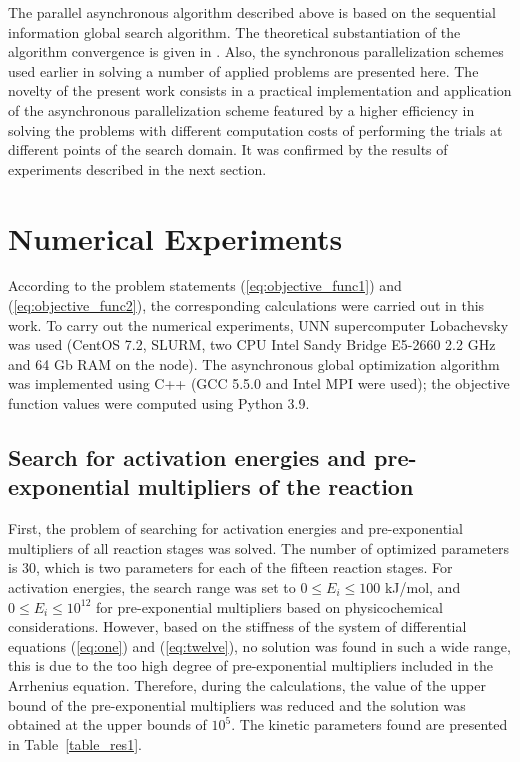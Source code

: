 \documentclass{svproc}
\begin{document}
The parallel asynchronous algorithm described above is based on the sequential information global search algorithm. The theoretical substantiation of the algorithm convergence is given in \cite{Strongin2000}. Also, the synchronous parallelization schemes used earlier in solving a number of applied problems \cite{Kalyulin2017,Modorskii2016} are presented here.
The novelty of the present work consists in a practical implementation and application of the asynchronous parallelization scheme featured by a higher efficiency in solving the problems with different computation costs of performing the trials at different points of the search domain. 
It was confirmed by the results of experiments described in the next section.

\section{Numerical Experiments}\label{Sec_Exp}

According to the problem statements (\ref{eq:objective_func1}) and (\ref{eq:objective_func2}), the corresponding calculations were carried out in this work.
To carry out the numerical experiments, UNN supercomputer Lobachevsky was used (CentOS 7.2, SLURM, two CPU Intel Sandy Bridge E5-2660 2.2 GHz and 64 Gb RAM on the node). The asynchronous global optimization algorithm was implemented using C++ (GCC 5.5.0 and Intel MPI were used); the objective function values were computed using Python 3.9.

\subsection{Search for activation energies and pre-exponential multipliers of the reaction}

First, the problem of searching for activation energies and pre-exponential multipliers of all reaction stages was solved. The number of optimized parameters is 30, which is two parameters for each of the fifteen reaction stages. For activation energies, the search range was set to $0 \leq E_i \leq 100$ kJ/mol, and $0 \leq E_i \leq 10^{12}$ for pre-exponential multipliers based on physicochemical considerations. However, based on the stiffness of the system of differential equations (\ref{eq:one}) and (\ref{eq:twelve}), no solution was found in such a wide range, this is due to the too high degree of pre-exponential multipliers included in the Arrhenius equation. Therefore, during the calculations, the value of the upper bound of the pre-exponential multipliers was reduced and the solution was obtained at the upper bounds of $10^5$. The kinetic parameters found are presented in Table~\ref{table_res1}.
\end{document}
